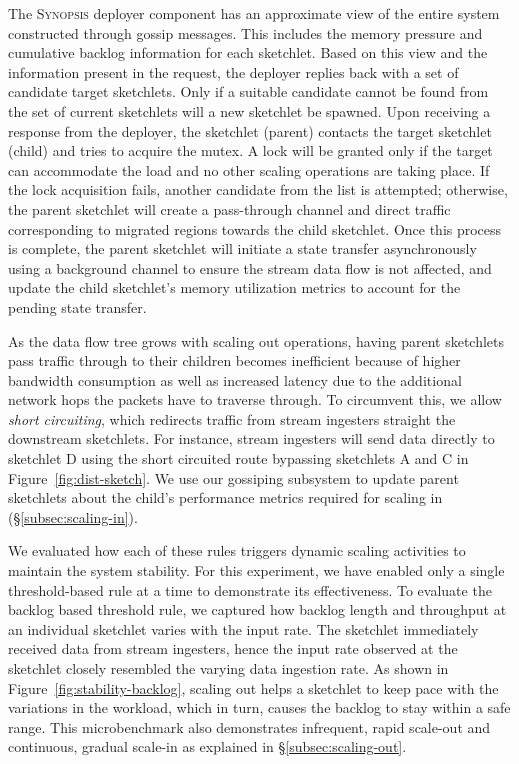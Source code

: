 %
The \textsc{Synopsis} deployer component has an approximate view of the entire system constructed through gossip messages. This includes the memory pressure and cumulative backlog information for each sketchlet.
Based on this view and the information present in the request, the deployer replies back with a set of candidate target sketchlets.
Only if a suitable candidate cannot be found from the set of current sketchlets will a new sketchlet be spawned.
Upon receiving a response from the deployer, the sketchlet (parent) contacts the target sketchlet (child) and tries to acquire the mutex.
A lock will be granted only if the target can accommodate the load and no other scaling operations are taking place.
If the lock acquisition fails, another candidate from the list is attempted; otherwise, the parent sketchlet will create a pass-through channel and direct traffic corresponding to migrated regions towards the child sketchlet.
Once this process is complete, the parent sketchlet will initiate a state transfer asynchronously using a background channel to ensure the stream data flow is not affected, and update the child sketchlet's memory utilization metrics to account for the pending state transfer.

As the data flow tree grows with scaling out operations, having parent sketchlets pass traffic through to their children becomes inefficient because of higher bandwidth consumption as well as increased latency due to the additional network hops the packets have to traverse through.
To circumvent this, we allow \emph{short circuiting}, which redirects traffic from stream ingesters straight the downstream sketchlets.
For instance, stream ingesters will send data directly to sketchlet D using the short circuited route bypassing sketchlets A and C in Figure~\ref{fig:dist-sketch}. 
We use our gossiping subsystem to update parent sketchlets about the child's performance metrics required for scaling in (\S\ref{subsec:scaling-in}).

We evaluated how each of these rules triggers dynamic scaling activities to maintain the system stability.
For this experiment, we have enabled only a single threshold-based rule at a time to demonstrate its effectiveness.
To evaluate the backlog based threshold rule, we captured how backlog length and throughput at an individual sketchlet varies with the input rate.
The sketchlet immediately received data from stream ingesters, hence the input rate observed at the sketchlet closely resembled the varying data ingestion rate.
As shown in Figure~\ref{fig:stability-backlog}, scaling out helps a sketchlet to keep pace with the variations in the workload, which in turn, causes the backlog to stay within a safe range.
This microbenchmark also demonstrates infrequent, rapid scale-out and continuous, gradual scale-in as explained in \S\ref{subsec:scaling-out}.


